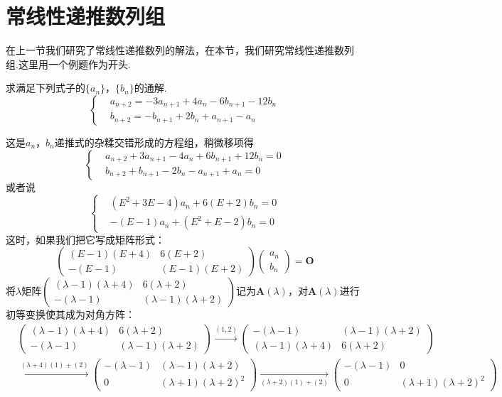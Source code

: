 \documentclass[10pt]{article}
\newcommand*{\D}{\text{，}}
\numberwithin{equation}{section}
\begin{document}
\section{常线性递推数列组}
在上一节我们研究了常线性递推数列的解法，在本节，我们研究常线性递推数列组.这里用一个例题作为开头.
\begin{LT}
    求满足下列式子的$\{a_n\}$，$\{b_n\}$的通解.
    \[
        \left\{
            \begin{aligned}
                &a_{n+2} = -3a_{n+1}+4a_n-6b_{n+1}-12b_n \\
                &b_{n+2} = -b_{n+1}+2b_n+a_{n+1}-a_n
            \end{aligned}
        \right.
    \]
\end{LT}
\begin{JT}
这是$a_n\D b_n$递推式的杂糅交错形成的方程组，稍微移项得
\[
        \left\{
            \begin{aligned}
                &a_{n+2}+3a_{n+1}-4a_n + 6b_{n+1} + 12b_n = 0\\
                &b_{n+2} + b_{n+1}-2b_n - a_{n+1} + a_n= 0
            \end{aligned}
        \right.
\]
或者说
\[
        \left\{
            \begin{aligned}
                &(E^2+3E-4)a_n + 6(E+2)b_n = 0\\
                &-(E-1)a_n + (E^2+E-2)b_n = 0
            \end{aligned}
        \right.
\]
这时，如果我们把它写成矩阵形式：
\[
    \begin{pmatrix} (E-1)(E+4) & 6(E+2) \\ -(E-1) & (E-1)(E+2) \end{pmatrix} \begin{pmatrix}
    a_n \\ b_n\end{pmatrix} = {\bm{O}}
\]
将$\lambda$矩阵$\begin{pmatrix} (\lambda-1)(\lambda+4) & 6(\lambda+2) \\ -(\lambda-1) & (\lambda-1)(\lambda+2) \end{pmatrix}$记为$\bm {A}(\lambda)$，对$\bm{A}(\lambda)$进行初等变换使其成为对角方阵：
\[ \begin{split}
        & \begin{pmatrix} (\lambda-1)(\lambda+4) & 6(\lambda+2) \\ -(\lambda-1) & (\lambda-1)(\lambda+2) \end{pmatrix} \xrightarrow[]{(1,2)} \begin{pmatrix} -(\lambda-1) & (\lambda-1)(\lambda+2) \\ (\lambda-1)(\lambda+4) & 6(\lambda+2) \end{pmatrix} \\ &\xrightarrow[]{(\lambda+4)(1) + (2)} \begin{pmatrix} -(\lambda-1) & (\lambda-1)(\lambda+2) \\ 0 & (\lambda+1)(\lambda+2)^2 \end{pmatrix} \xrightarrow[(\lambda+2)(1)+(2)]{} \begin{pmatrix} -(\lambda-1) & 0 \\ 0 & (\lambda+1)(\lambda+2)^2 \end{pmatrix}

\end{split}\]
\end{JT}
\end{document}
